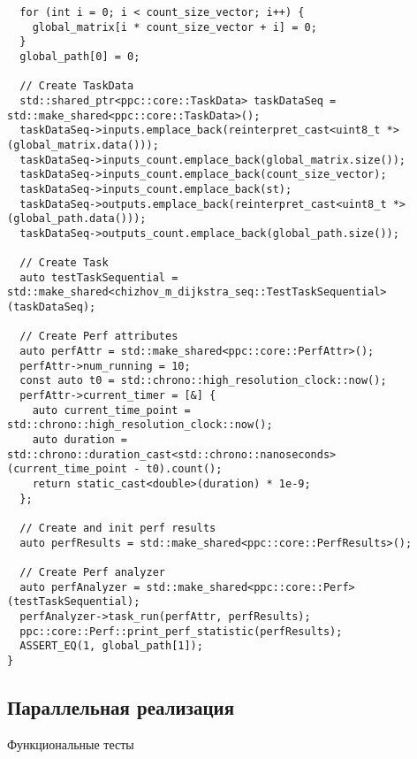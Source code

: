 \documentclass[a4paper, 14pt]{extarticle}
\begin{document}
\begin{lstlisting}
  for (int i = 0; i < count_size_vector; i++) {
    global_matrix[i * count_size_vector + i] = 0;
  }
  global_path[0] = 0;

  // Create TaskData
  std::shared_ptr<ppc::core::TaskData> taskDataSeq = std::make_shared<ppc::core::TaskData>();
  taskDataSeq->inputs.emplace_back(reinterpret_cast<uint8_t *>(global_matrix.data()));
  taskDataSeq->inputs_count.emplace_back(global_matrix.size());
  taskDataSeq->inputs_count.emplace_back(count_size_vector);
  taskDataSeq->inputs_count.emplace_back(st);
  taskDataSeq->outputs.emplace_back(reinterpret_cast<uint8_t *>(global_path.data()));
  taskDataSeq->outputs_count.emplace_back(global_path.size());

  // Create Task
  auto testTaskSequential = std::make_shared<chizhov_m_dijkstra_seq::TestTaskSequential>(taskDataSeq);

  // Create Perf attributes
  auto perfAttr = std::make_shared<ppc::core::PerfAttr>();
  perfAttr->num_running = 10;
  const auto t0 = std::chrono::high_resolution_clock::now();
  perfAttr->current_timer = [&] {
    auto current_time_point = std::chrono::high_resolution_clock::now();
    auto duration = std::chrono::duration_cast<std::chrono::nanoseconds>(current_time_point - t0).count();
    return static_cast<double>(duration) * 1e-9;
  };

  // Create and init perf results
  auto perfResults = std::make_shared<ppc::core::PerfResults>();

  // Create Perf analyzer
  auto perfAnalyzer = std::make_shared<ppc::core::Perf>(testTaskSequential);
  perfAnalyzer->task_run(perfAttr, perfResults);
  ppc::core::Perf::print_perf_statistic(perfResults);
  ASSERT_EQ(1, global_path[1]);
}
\end{lstlisting}

\subsection{Параллельная реализация}

Функциональные тесты\\
\end{document}
